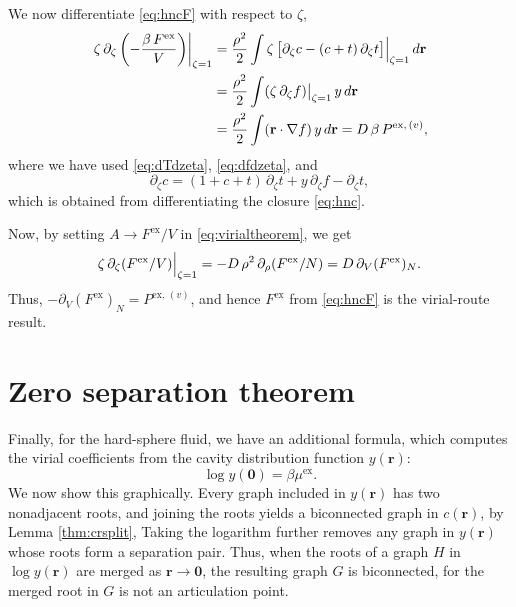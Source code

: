 \documentclass[aip,jcp,reprint,superscriptaddress]{revtex4-1}
\newcommand{\vct}[1]{\mathbf{#1}}
\providecommand{\vr}{} %
\renewcommand{\vr}{\vct{r}}
\newcommand{\supex}[1]{ { { #1 }^{ \mathrm{ex} } } }
\newcommand{\supexv}[1]{ { { #1 }^{ \mathrm{ex}, \, (v) } } }
\newcommand{\Pex}{\supex{P}}
\newcommand{\Pexv}{\supexv{P}}
\newcommand{\Fex}{\supex{F}}
\newcommand{\muex}{\supex{\mu}}
\begin{document}
We now differentiate \eqref{eq:hncF} with respect to $\zeta$,
\begin{align}
  \left. \zeta \, \partial_\zeta \left(-\frac{ \beta\,\Fex }{ V }\right) \right|_{\zeta = 1}
&=
\frac{\rho^2}{2} \int
  \zeta \, \bigl[
    \partial_\zeta c - (c + t) \, \partial_\zeta t
  \bigr] \Big|_{\zeta = 1} \, d\vr
  \notag \\
&= \frac{\rho^2}{2} \int (\zeta \, \partial_\zeta f) \big|_{\zeta = 1} \, y \, d\vr
  \notag \\
&= \frac{\rho^2}{2} \int (\vr \cdot \nabla f) \, y \, d\vr
= D \, \beta \, \Pexv,
  \notag
\end{align}
%
where we have used \eqref{eq:dTdzeta}, \eqref{eq:dfdzeta}, %
and
\[
  \partial_\zeta c
  = (1 + c + t) \, \partial_\zeta t
  + y \, \partial_\zeta f - \partial_\zeta t,
\]
which is obtained from differentiating the closure \eqref{eq:hnc}.

Now, by setting $A \rightarrow \Fex / V$ in \eqref{eq:virialtheorem}, we get
\begin{align}
  \zeta \, \partial_\zeta (\Fex/V) \Big|_{\zeta = 1}
  = -D \, \rho^2 \, \partial_\rho (\Fex/N)
  = D \, \partial_V (\Fex)_N.
    \notag %
\end{align}
Thus, $-\partial_V (\Fex)_N = \Pexv$,
and hence $\Fex$ from \eqref{eq:hncF} is the virial-route result.
%





\section{Zero separation theorem}

Finally, for the hard-sphere fluid, we have an additional formula,
  which computes the virial coefficients
  from the cavity distribution function $y(\vr)$\cite{hoover1962}:
%
\begin{equation}
  \log y(\vct0) = \beta \muex.
  \label{eq:yrzerosep}
\end{equation}
%
We now show this graphically.
%
Every graph included in $y(\vr)$
  has two nonadjacent roots\cite{hansen},
%
  and joining the roots
  yields a biconnected graph in $c(\vr)$,
  by Lemma \ref{thm:crsplit},
%
Taking the logarithm further
  removes any graph in $y(\vr)$
  whose roots form
  a separation pair\cite{hansen}.
%
Thus, when the roots of a graph $H$ in $\log y(\vr)$
  are merged as $\vr \rightarrow \vct0$,
  the resulting graph $G$ is biconnected,
  for the merged root in $G$ is not an articulation point.
\end{document}
